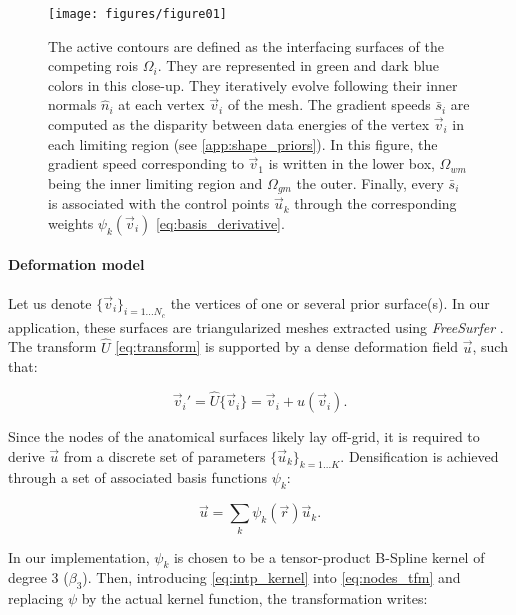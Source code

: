 \begin{figure}
	\texttt{[image: figures/figure01]}
	\caption{The active contours are defined as the interfacing surfaces of the competing
	  \glspl{roi} $\Omega_i$.
	They are represented in green and dark blue colors in this close-up.
	They iteratively evolve following their inner normals $\hat{n}_i$ at each vertex
	  $\vec{v}_i$ of the mesh.
	The gradient speeds $\bar{s}_i$ are computed as the disparity between data energies of
	  the vertex $\vec{v}_i$ in each limiting region (see \autoref{app:shape_priors}).
	In this figure, the gradient speed corresponding to $\vec{v}_1$ is written in the lower
	  box, $\Omega_{wm}$ being the inner limiting region and $\Omega_{gm}$ the outer.
	Finally, every $\bar{s}_i$ is associated with the control points $\vec{u}_k$ through
	  the corresponding weights $\psi_k(\vec{v}_i)$ \eqref{eq:basis_derivative}.
	}\label{fig:method}
\end{figure}

\paragraph*{Deformation model}\label{sec:deformation_model}
Let us denote $\{\vec{v}_i\}_{i=1 \ldots N_c}$ the vertices of one or several prior
  surface(s).
In our application, these surfaces are triangularized meshes extracted using \emph{FreeSurfer}
  \citep{fischl_freesurfer_2012}.
The transform $\hat{U}$ \eqref{eq:transform} is supported by a dense deformation field
  $\vec{u}$, such that:

  \begin{equation}
  \vec{v}_i' = \hat{U}\{\vec{v}_i\} = \vec{v}_i + u(\vec{v}_i).
  \label{eq:nodes_tfm}
  \end{equation}

Since the nodes of the anatomical surfaces likely lay off-grid, it is required to
  derive $\vec{u}$ from a discrete set of parameters $\{\vec{u}_k\}_{k=1 \ldots K}$.
Densification is achieved through a set of associated basis functions $\psi_k$:

  \begin{equation}
  \vec{u} = \sum_k \psi_k(\vec{r}) \vec{u}_k.
  \label{eq:intp_kernel}
  \end{equation}

In our implementation, $\psi_k$ is chosen to be a tensor-product B-Spline kernel
  of degree 3 ($\beta_3$).
Then, introducing \eqref{eq:intp_kernel} into \eqref{eq:nodes_tfm} and replacing
  $\psi$ by the actual kernel function, the transformation writes:

